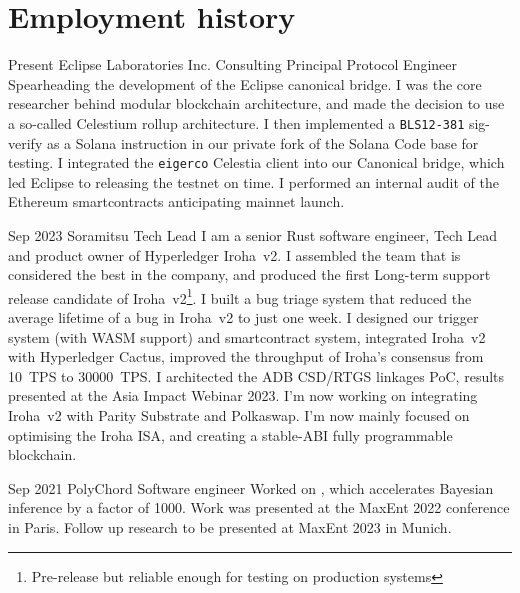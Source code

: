 \documentclass{CurriculumVitae}[10pt, condensed]
\begin{document}
\section*{Employment history} {%
\setlength{\parindent}{0in}%

%
    {Present}%
    {Eclipse Laboratories Inc.}%
    {Consulting Principal Protocol Engineer}
    {Spearheading the development of the Eclipse canonical bridge.  I was
      the core researcher behind modular blockchain architecture, and made
      the decision to use a so-called Celestium rollup architecture.  I
      then implemented a \texttt{BLS12-381} sig-verify as a Solana
      instruction in our private fork of the Solana Code base for testing.
      I integrated the \texttt{eigerco} Celestia client into our Canonical
      bridge, which led Eclipse to releasing the testnet on time.
      I performed an internal audit of the Ethereum smartcontracts
      anticipating mainnet launch.}%

%
    {Sep 2023}%
    {Soramitsu}%
    {Tech Lead}%
    {I am a senior Rust software engineer, Tech Lead and product owner
      of Hyperledger Iroha~v2.  I assembled the team that is considered
      the best in the company, and produced the first Long-term support
      release candidate of Iroha~v2\footnote{Pre-release but reliable
      enough for testing on production systems}. I built a bug triage
      system that reduced the average lifetime of a bug in Iroha~v2 to
      just one week. I designed our trigger system (with WASM support)
      and smartcontract system, integrated Iroha~v2 with Hyperledger
      Cactus, improved the throughput of Iroha's consensus from 10~TPS
      to 30000~TPS. I architected the ADB CSD/RTGS linkages PoC, results
      presented at the Asia Impact Webinar 2023.  I'm now working on
      integrating Iroha~v2 with Parity Substrate and Polkaswap.  I'm now
      mainly focused on optimising the Iroha ISA, and creating a
      stable-ABI fully programmable blockchain. }%

%
    {Sep 2021}%
    {PolyChord}%
    {Software engineer}%
    { Worked on , which accelerates Bayesian inference
      by a factor of 1000. Work was presented at the MaxEnt 2022
      conference in Paris. Follow up research to be presented at MaxEnt
      2023 in Munich. }


\begin{comment}
  \job{Jul 2020}{Oct 2020} {Cambridge DAMTP} {QA intern} {Designed a
    neural network for vetting the applicability of the NHSx X-ray
    data for automated diagnosis of COVID-19, which was comparable in
    precision, but required 5--6 times less processing power.  }
\end{comment}

}
\end{document}
